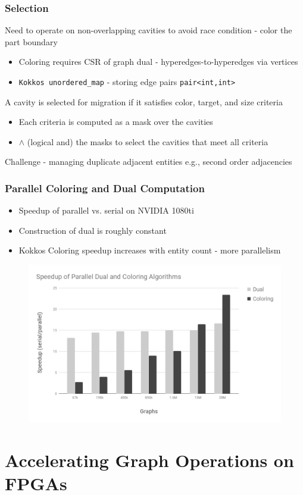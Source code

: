 \documentclass{beamer}
\begin{document}
\begin{frame}
  \frametitle{Selection}
  Need to operate on non-overlapping cavities to avoid race condition - color the part boundary
  \begin{itemize}
    \item Coloring requires CSR of graph dual - hyperedges-to-hyperedges via vertices
    \item \texttt{Kokkos unordered\_map} - storing edge pairs \texttt{pair<int,int>}
  \end{itemize}
  A cavity is selected for migration if it satisfies color, target, and size criteria
  \begin{itemize}
    \item Each criteria is computed as a mask over the cavities
    \item $\land$ (logical and) the masks to select the cavities that meet all criteria
  \end{itemize}
  Challenge - managing duplicate adjacent entities e.g., second order adjacencies
 \end{frame}

\begin{frame}
  \frametitle{Parallel Coloring and Dual Computation}
  \begin{itemize}
    \item Speedup of parallel vs. serial on NVIDIA 1080ti
    \item Construction of dual is roughly constant
    \item Kokkos Coloring speedup increases with entity count - more parallelism
  \end{itemize}
  \begin{figure}
    \centering
    \includegraphics[width=.7\textwidth]{figures/kkColoringAndDual.png}
  \end{figure}
\end{frame}

\section{Accelerating Graph Operations on FPGAs}
\end{document}

